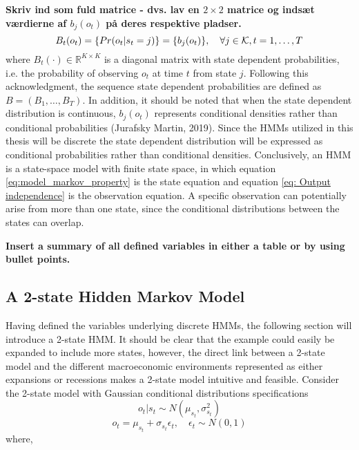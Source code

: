 \textbf{Skriv ind som fuld matrice - dvs. lav en $2\times2$ matrice og indsæt værdierne af $b_j(o_t)$ på deres respektive pladser.}
\begin{equation}
    B_t(o_t)= \{ Pr(o_t|s_t=j) \} = \{ b_j(o_t) \}, \quad \forall j \in \operatorname{\mathcal{K}}, t=1,\ldots,T 
\end{equation}
where $B_t(\cdot)\in \mathbb{R}^{K\times K}$ is a diagonal matrix with state dependent probabilities, i.e. the probability of observing $o_t$ at time $t$ from state $j$. Following this acknowledgment, the sequence state dependent probabilities are defined as $B=(B_1,\ldots,B_T)$. In addition, it should be noted that when the state dependent distribution is continuous, $b_j(o_t)$ represents conditional densities rather than conditional probabilities (Jurafsky Martin, 2019). Since the HMMs utilized in this thesis will be discrete the state dependent distribution will be expressed as conditional probabilities rather than conditional densities. Conclusively, an HMM is a state-space model with finite state space, in which equation \ref{eq:model_markov_property} is the state equation and equation \ref{eq: Output independence} is the observation equation. A specific observation can potentially arise from more than one state, since the conditional distributions between the states can overlap.

\textbf{Insert a summary of all defined variables in either a table or by using bullet points.}

\subsection{A 2-state Hidden Markov Model}
Having defined the variables underlying discrete HMMs, the following section will introduce a 2-state HMM. It should be clear that the example could easily be expanded to include more states, however, the direct link between a 2-state model and the different macroeconomic environments represented as either expansions or recessions makes a 2-state model intuitive and feasible. Consider the 2-state model with Gaussian conditional distributions specifications
\begin{equation}
     o_t|s_t \sim N(\mu_{s_t},\sigma^2_{s_t}) 
\end{equation}
\begin{equation}
   o_t = \mu_{s_t}  + \sigma_{s_t}\epsilon_{t}
   ,\quad \epsilon_{t} \sim N(0,1)   
\end{equation}
where,

